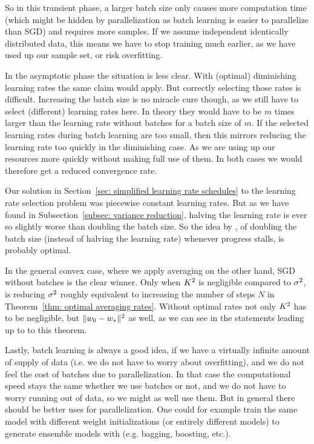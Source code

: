 So in this transient phase, a larger batch size only causes more computation
time (which might be hidden by parallelization as batch learning is easier to
parallelize than SGD) and requires more samples. If we assume independent
identically distributed data, this means we have to stop training much earlier, as
we have used up our sample set, or risk overfitting.

In the asymptotic phase the situation is less clear. With (optimal) diminishing
learning rates the same claim would apply. But correctly selecting those rates
is difficult. Increasing the batch size is no miracle cure though, as we still
have to select (different) learning rates here. In theory they would have to
be \(m\) times larger than the learning rate without batches for a batch
size of \(m\). If the selected learning rates during batch learning are too
small, then this mirrors reducing the learning rate too quickly in the diminishing
case. As we are using up our resources more quickly without making full use of
them. In both cases we would therefore get a reduced convergence rate.

Our solution in Section~\ref{sec: simplified learning rate schedules} to the
learning rate selection problem was piecewise constant learning rates. But
as we have found in Subsection~\ref{subsec: variance reduction}, halving the
learning rate is ever so slightly worse than doubling the batch size. So the
idea by \textcite{smithDonDecayLearning2018}, of doubling the batch size
(instead of halving the learning rate) whenever progress stalls, is probably
optimal.

In the general convex case, where we apply averaging on the other hand, SGD
without batches is the clear winner. Only when \(K^2\) is negligible
compared to \(\sigma^2\), is reducing \(\sigma^2\) roughly equivalent to
increasing the number of steps \(N\) in Theorem~\ref{thm: optimal averaging rates}.
Without optimal rates not only \(K^2\) has to be negligible, but
\(\|w_0 -w_*\|^2\) as well, as we can see in the statements leading
up to to this theorem.

Lastly, batch learning is always a good idea, if we have a virtually infinite
amount of supply of data (i.e. we do not have to worry about overfitting), and
we do not feel the cost of batches due to parallelization. In that case the
computational speed stays the same whether we use batches or not, and we do not
have to worry running out of data, so we might as well use them. But in general
there should be better uses for parallelization. One could for example train
the same model with different weight initializations (or entirely different
models) to generate ensemble models with (e.g. bagging, boosting, etc.).

